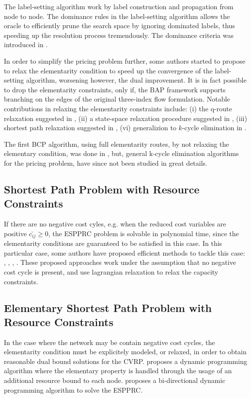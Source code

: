 
The label-setting algorithm work by label construction and propagation from node to node.
The dominance rules in the label-setting algorithm allows the oracle
to efficiently prune the search space by ignoring dominated labels, thus speeding
up the resolution process tremendously.
The dominance criteria was introduced in \cite{feillet2004}.

In order to simplify the pricing problem further,
some authors started to propose to relax the elementarity condition
to speed up the convergence of the label-setting algorithm, worsening however, the dual improvement.
It is in fact possible to drop the elementarity constraints, only if, the BAP framework supports
branching on the edges of the original three-index flow formulation.
Notable contributions in relaxing the elementarity constraints include:
(i) the q-route relaxation suggested in \textcite{christofides1981},
(ii) a state-space relaxation procedure suggested in \textcite{christofides1981a},
(iii) shortest path relaxation suggested in \textcite{desrosiers1984},
(vi) generalizion to $k$-cycle elimination in \textcite{irnich2006}.

The first BCP algorithm, using full elementarity routes, by not relaxing the elementary
condition, was done in \cite{chabrier2006},
but, general k-cycle elimination algorithms for the pricing problem, have since not been studied
in great details.

\subsection{Shortest Path Problem with Resource Constraints}
If there are no negative cost cyles, e.g. when the reduced cost variables are positive $\bar{c_{ij}} \ge 0$,
the ESPPRC problem is solvable in polynomial time, since the elementarity conditions are guaranteed
to be satisfied in this case.
In this particular case, some authors have proposed efficient methods to tackle this case:
\cite{beasley1989}, \cite{carlyle2008}, \cite{dumitrescu2003}, \cite{muhandiramge2009}.
These proposed approaches work under the assumption that no negative cost cycle is present,
and use lagrangian relaxation to relax the capacity constraints.


\subsection{Elementary Shortest Path Problem with Resource Constraints}
In the case where the network may be contain negative cost cycles, the
elementarity condition must be explicitely modeled, or relaxed, in order
to obtain reasonable dual bound solutions for the CVRP.
\textcite{feillet2004} proposes a dynamic programming algorithm where
the elementary property is handled through the usage of an additional resource
bound to each node.
\textcite{righini2006} proposes a bi-directional dynamic programming algorithm to solve the ESPPRC.


